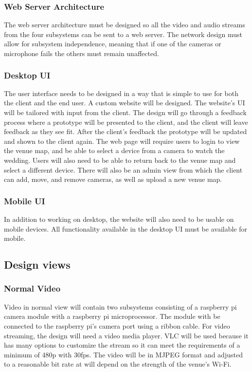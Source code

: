 \documentclass[onecolumn, draftclsnofoot,10pt, compsoc]{IEEEtran}
\begin{document}
        \subsubsection{Web Server Architecture}
        The web server architecture must be designed so all the video and audio streams from the four subsystems can be sent to a web server. 
        The network design must allow for subsystem independence, meaning that if one of the cameras or microphone fails the others must remain unaffected.  
        
        \subsubsection{Desktop UI}
        The user interface needs to be designed in a way that is simple to use for both the client and the end user. 
        A custom website will be designed. The website's UI will be tailored with input from the client.  
        The design will go through a feedback process where a prototype will be presented to the client, and the client will leave feedback as they see fit. 
        After the client's feedback the prototype will be updated and shown to the client again. 
        The web page will require users to login to view the venue map, and be able to select a device from a camera to watch the wedding. 
        Users will also need to be able to return back to the venue map and select a different device. 
        There will also be an admin view from which the client can add, move, and remove cameras, as well as upload a new venue map.
        
        \subsubsection{Mobile UI}
        In addition to working on desktop, the website will also need to be usable on mobile devices. 
        All functionality available in the desktop UI must be available for mobile.
        
    \subsection{Design views}
        \subsubsection{Normal Video}
        Video in normal view will contain two subsystems consisting of a raspberry pi camera module with a raspberry pi microprocessor. 
        The module with be connected to the raspberry pi's camera port using a ribbon cable. 
        For video streaming, the design will need a video media player. 
        VLC will be used because it has many options to customize the stream so it can meet the requirements of a minimum of 480p with 30fps. 
        The video will be in  MJPEG format and adjusted to a reasonable bit rate at will depend on the strength of the venue's Wi-Fi. 
        
\end{document}
